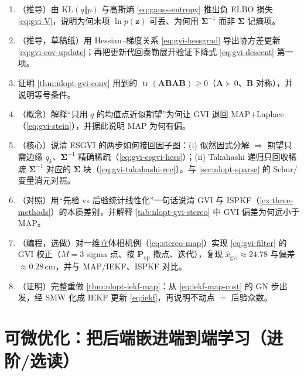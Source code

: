 \begin{practice}
\begin{enumerate}
  \item （推导）由 $\mathrm{KL}(q\Vert p)$ 与高斯熵 \cref{eq:gauss-entropy} 推出负 ELBO 损失 \cref{eq:gvi-V}，说明为何末项 $\ln p(\mathbf{z})$ 可丢、为何用 $\boldsymbol{\Sigma}^{-1}$ 而非 $\boldsymbol{\Sigma}$ 记熵项。
  \item （推导，草稿纸）用 Hessian--梯度关系 \cref{eq:gvi-hessgrad} 导出协方差更新 \cref{eq:gvi-cov-update}；再把更新代回泰勒展开验证下降式 \cref{eq:gvi-descent} 第一项。
  \item 证明 \cref{thm:nlopt-gvi-conv} 用到的 $\operatorname{tr}(\mathbf{A}\mathbf{B}\mathbf{A}\mathbf{B})\ge0$（$\mathbf{A}\succ0$、$\mathbf{B}$ 对称），并说明等号条件。
  \item （概念）解释“只用 $q$ 的均值点近似期望”为何让 GVI 退回 MAP$+$Laplace（\cref{eq:gvi-stein}），并据此说明 MAP 为何有偏。
  \item （核心）说清 ESGVI 的两步如何接回因子图：(i) 似然因式分解 $\Rightarrow$ 期望只需边缘 $q_k$、$\boldsymbol{\Sigma}^{-1}$ 精确稀疏（\cref{eq:gvi-esgvi-hess}）；(ii) Takahashi 递归只回收稀疏 $\boldsymbol{\Sigma}^{-1}$ 对应的 $\boldsymbol{\Sigma}$ 块（\cref{eq:gvi-takahashi-rec}）。与 \cref{sec:nlopt-sparse} 的 Schur/变量消元对照。
  \item （对照）用“先验 vs 后验统计线性化”一句话说清 GVI 与 ISPKF（\cref{ex:three-methods}）的本质差别，并解释 \cref{tab:nlopt-gvi-stereo} 中 GVI 偏差为何远小于 MAP。
  \item （编程，选做）对一维立体相机例（\cref{eq:stereo-map}）实现 \cref{eq:gvi-filter} 的 GVI 校正（$M=3$ sigma 点、按 $\mathbf{P}_{\mathrm{op}}$ 撒点、迭代），复现 $\hat{x}_{\text{gvi}}\approx24.78$ 与偏差 $\approx0.28$\,cm，并与 MAP/IEKF、ISPKF 对比。
  \item （证明）完整重做 \cref{thm:nlopt-iekf-map}：从 \cref{eq:iekf-map-cost} 的 GN 步出发，经 SMW 化成 IEKF 更新 \cref{eq:iekf}，再说明不动点 $=$ 后验众数。
\end{enumerate}
\end{practice}

\section{可微优化：把后端嵌进端到端学习（进阶/选读）}
\label{sec:nlopt-diffopt}

